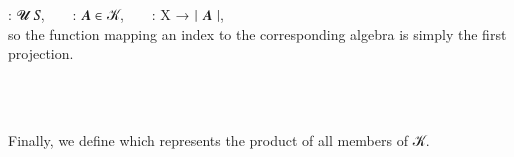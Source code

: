  \as :  \ab 𝓤 \ab 𝑆, ~ ~  \as : \ab 𝑨 \af ∈ \ab 𝒦, ~ ~  \as : \ab X \as → \af ∣ \ab 𝑨 \af ∣,\\[4pt] so the function mapping an index to the corresponding algebra is simply the first projection.
\ccpad
\begin{code}%
\>[1]\AgdaSpace{}%
\AgdaSymbol{:}\AgdaSpace{}%
\AgdaSymbol{(}\AgdaSpace{}%
\AgdaSymbol{:}\AgdaSpace{}%
\AgdaSpace{}%
\AgdaSymbol{(}\AgdaSpace{}%
\AgdaSpace{}%
\AgdaSymbol{)(}\AgdaSpace{}%
\AgdaSymbol{))}\AgdaSpace{}%
\AgdaSpace{}%
\AgdaSpace{}%
\AgdaSpace{}%
\AgdaSpace{}%
\AgdaSpace{}%
\AgdaSpace{}%
\<%
\\
%
\\[\AgdaEmptyExtraSkip]%
%
\>[1]\AgdaSpace{}%
\AgdaSpace{}%
\AgdaSymbol{=}\AgdaSpace{}%
\AgdaSpace{}%
\AgdaSymbol{(}\AgdaSpace{}%
\AgdaSymbol{:}\AgdaSpace{}%
\AgdaSymbol{(}\AgdaSpace{}%
\AgdaSymbol{))}\AgdaSpace{}%
\AgdaSpace{}%
\AgdaSpace{}%
\AgdaSpace{}%
\<%
\end{code}
\ccpad
Finally, we define  which represents the product of all members of \ab 𝒦.
\ccpad
\begin{code}%
\>[1]\AgdaSpace{}%
\AgdaSymbol{:}\AgdaSpace{}%
\AgdaSpace{}%
\AgdaSymbol{(}\AgdaSpace{}%
\AgdaSpace{}%
\AgdaSymbol{)(}\AgdaSpace{}%
\AgdaSymbol{)}\AgdaSpace{}%
\AgdaSpace{}%
\AgdaSpace{}%
\AgdaSymbol{(}\AgdaSpace{}%
\AgdaSpace{}%
\AgdaSpace{}%
\AgdaSymbol{)}\AgdaSpace{}%
\<%
\\
%
\\[\AgdaEmptyExtraSkip]%
%
\>[1]\AgdaSpace{}%
\AgdaSpace{}%
\AgdaSymbol{=}\AgdaSpace{}%
\AgdaSpace{}%
\AgdaSymbol{(}\AgdaSpace{}%
\AgdaSpace{}%
\AgdaSpace{}%
\AgdaSymbol{)}\<%
\end{code}
\ccpad
